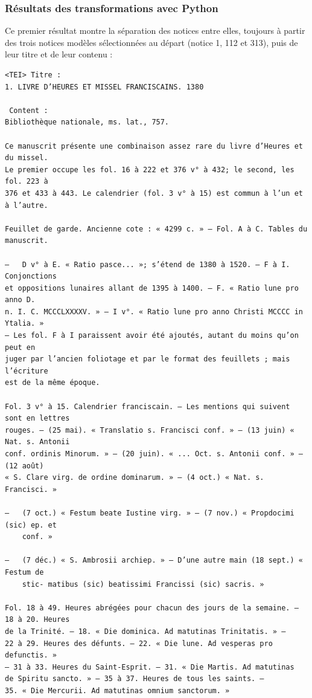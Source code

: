 \documentclass[a4paper,12pt,twoside]{book}
\begin{document}
	\subsubsection{\label{resultats_python}Résultats des transformations avec Python}
	
	Ce premier résultat montre la séparation des notices entre elles, toujours à partir des trois notices modèles sélectionnées au départ (notice 1, 112 et 313), puis de leur titre et de leur contenu : 

	\begin{verbatim}
<TEI> Titre : 
1. LIVRE D’HEURES ET MISSEL FRANCISCAINS. 1380
 
 Content : 
Bibliothèque nationale, ms. lat., 757.

Ce manuscrit présente une combinaison assez rare du livre d’Heures et du missel. 
Le premier occupe les fol. 16 à 222 et 376 v° à 432; le second, les fol. 223 à 
376 et 433 à 443. Le calendrier (fol. 3 v° à 15) est commun à l’un et à l’autre.

Feuillet de garde. Ancienne cote : « 4299 c. » — Fol. A à C. Tables du manuscrit.

—	D v° à E. « Ratio pasce... »; s’étend de 1380 à 1520. — F à I. Conjonctions 
et oppositions lunaires allant de 1395 à 1400. — F. « Ratio lune pro anno D. 
n. I. C. MCCCLXXXXV. » — I v°. « Ratio lune pro anno Christi MCCCC in Ytalia. »
— Les fol. F à I paraissent avoir été ajoutés, autant du moins qu’on peut en 
juger par l’ancien foliotage et par le format des feuillets ; mais l’écriture 
est de la même époque.

Fol. 3 v° à 15. Calendrier franciscain. — Les mentions qui suivent sont en lettres
rouges. — (25 mai). « Translatio s. Francisci conf. » — (13 juin) « Nat. s. Antonii 
conf. ordinis Minorum. » — (20 juin). « ... Oct. s. Antonii conf. » — (12 août) 
« S. Clare virg. de ordine dominarum. » — (4 oct.) « Nat. s. Francisci. »

—	(7 oct.) « Festum beate Iustine virg. » — (7 nov.) « Propdocimi (sic) ep. et
	conf. »

—	(7 déc.) « S. Ambrosii archiep. » — D’une autre main (18 sept.) « Festum de
	stic- matibus (sic) beatissimi Francissi (sic) sacris. »

Fol. 18 à 49. Heures abrégées pour chacun des jours de la semaine. — 18 à 20. Heures 
de la Trinité. — 18. « Die dominica. Ad matutinas Trinitatis. » — 
22 à 29. Heures des défunts. — 22. « Die lune. Ad vesperas pro defunctis. » 
— 31 à 33. Heures du Saint-Esprit. — 31. « Die Martis. Ad matutinas 
de Spiritu sancto. » — 35 à 37. Heures de tous les saints. — 
35. « Die Mercurii. Ad matutinas omnium sanctorum. »


\end{verbatim}
\end{document}
